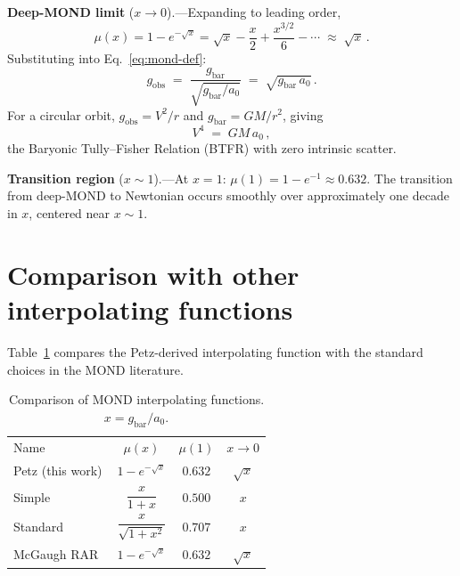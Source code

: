 \documentclass[prd,twocolumn,superscriptaddress,longbibliography,floatfix]{revtex4-2}
\begin{document}
\textbf{Deep-MOND limit} ($x \to 0$).---Expanding to leading
order,
\begin{equation}
  \mu(x) = 1 - e^{-\sqrt{x}}
  = \sqrt{x} - \frac{x}{2} + \frac{x^{3/2}}{6} - \cdots
  \;\approx\; \sqrt{x}\,.
  \label{eq:mond-limit}
\end{equation}
Substituting into Eq.~\eqref{eq:mond-def}:
\begin{equation}
  g_{\mathrm{obs}} \;=\;
  \frac{g_{\mathrm{bar}}}{\sqrt{g_{\mathrm{bar}}/a_0}}
  \;=\; \sqrt{g_{\mathrm{bar}}\,a_0}\,.
  \label{eq:deep-mond}
\end{equation}
For a circular orbit, $g_{\mathrm{obs}} = V^2/r$ and
$g_{\mathrm{bar}} = GM/r^2$, giving
\begin{equation}
  V^4 \;=\; G M\,a_0\,,
  \label{eq:btfr}
\end{equation}
the Baryonic Tully--Fisher Relation (BTFR) with zero intrinsic
scatter. \checkmark

\textbf{Transition region} ($x \sim 1$).---At
$x = 1$: $\mu(1) = 1 - e^{-1} \approx 0.632$. The transition
from deep-MOND to Newtonian occurs smoothly over approximately one
decade in $x$, centered near $x \sim 1$.

\section{Comparison with other interpolating functions}
\label{sec:comparison}

Table~\ref{tab:comparison} compares the Petz-derived interpolating
function with the standard choices in the MOND literature.

\begin{table}[t]
\centering
\caption{Comparison of MOND interpolating functions.
$x = g_{\mathrm{bar}}/a_0$.}
\label{tab:comparison}
\begin{ruledtabular}
\begin{tabular}{lccc}
\textrm{Name} & $\mu(x)$ & $\mu(1)$ &
  \textrm{$x\to 0$} \\
\colrule
Petz (this work) &
  $1 - e^{-\sqrt{x}}$ & $0.632$ & $\sqrt{x}$ \\
Simple~\cite{Famaey2005} &
  $\dfrac{x}{1+x}$ & $0.500$ & $x$ \\
Standard~\cite{Milgrom1983} &
  $\dfrac{x}{\sqrt{1+x^2}}$ & $0.707$ & $x$ \\
McGaugh RAR~\cite{McGaugh2016} &
  $1 - e^{-\sqrt{x}}$ & $0.632$ & $\sqrt{x}$ \\
\end{tabular}
\end{ruledtabular}
\end{table}
\end{document}
